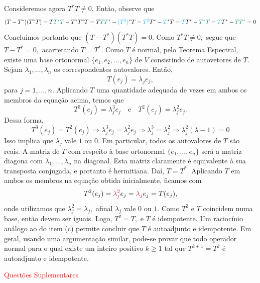 \documentclass[11pt,a4paper]{article}
\begin{document}
{{ Consideremos agora $T^{*}T \neq 0.$ Então, observe que
 \[
 (T - T^{*})(T^{*}T) = T\textcolor{PineGreen}{T^{*}T} - T^{*}T^{*}T = T\textcolor{PineGreen}{TT^*} - \textcolor{ProcessBlue}{(T^2)}^{*}T =  \textcolor{ProcessBlue}{T^2}T^* - \textcolor{ProcessBlue}{T}^{*}T =   \textcolor{ProcessBlue}{T}T^* - \textcolor{PineGreen}{T^{*}T} =   \textcolor{ProcessBlue}{T}T^* - \textcolor{PineGreen}{TT^{*}} = 0
 \]
 Concluímos portanto que $(T - T^{*})(T^{*}T) = 0.$ Como $T^{*}T \neq 0,$ segue que $T - T^{*} = 0,$ acarretando $T = T^{*}.$
  \task[\pers{c}] Como $T$ é normal, pelo Teorema Espectral, existe uma base ortonormal $\{e_1, e_2, \ldots, e_n \}$ de $V$ consistindo de autovetores de $T.$ Sejam $\lambda_1, \ldots, \lambda_n$ os correspondentes autovalores. Então,
  \[
  T(e_j) = \lambda_j e_j,
  \]
  para $j = 1, \ldots, n.$ Aplicando $T$ uma quantidade adequada de vezes em ambos os membros da equação acima, temos que
\[
T^3(e_j) = \lambda_j^3e_j \quad \mbox{e} \quad T^2(e_j) = \lambda_j^{2}e_j.
\]
Dessa forma,
\[
T^3(e_j) = T^2(e_j) \Rightarrow \lambda_j^3e_j = \lambda_j^{2}e_j \Rightarrow \lambda_j^3 = \lambda_j^2 \Rightarrow \lambda_j^2(\lambda - 1) = 0
\]
Isso implica que $\lambda_j$ vale $1$
 ou $0.$ Em particular, todos os autovalores de $T$ são reais. A matriz de $T$ com respeito à base ortonormal $\{e_1, \ldots, e_n \}$ será a matriz diagona com $\lambda_1, \ldots, \lambda_n$ na diagonal. Esta matriz claramente é equivalente à sua transposta conjugada, e portanto é hermitiana. Daí, $T = T^{*}.$ %
 Aplicando $T$ em ambos os membros na equação obtida inicialmente, ficamos com
 \[
 T^2(e_j) = \textcolor{Maroon}{\lambda^2_j} e_j = \textcolor{Maroon}{\lambda_j} e_j = T(e_j),
 \]
 onde utilizamos que $\lambda_j^2 = \lambda_j,$ afinal $\lambda_j$ vale $0$ ou $1.$ Como $T^2$ e $T$ coincidem numa base, então devem ser iguais. Logo, $T^2 = T,$ e $T$ é idempotente.
 \task[\pers{d}] Um raciocínio análogo ao do item (c)  permite concluir que $T$  é autoadjunto e idempotente. Em geral, usando uma argumentação similar, pode-se provar que todo operador normal para o qual existe um inteiro positivo $k \ge 1$ tal que $T^{k+1} = T^k$ é autoadjunto e idempotente.
 }
}


\solucao{}
\textcolor{Red}{Questões Suplementares}
\end{document}
